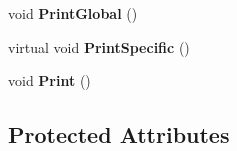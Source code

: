\begin{DoxyCompactItemize}
\item 
\hypertarget{classElement_afcde5aa81a52b90a8bcf903d9b773ebc}{void {\bfseries Print\+Global} ()}\label{classElement_afcde5aa81a52b90a8bcf903d9b773ebc}

\item 
\hypertarget{classElement_adef0eb8aa2179a099c38d96217c237c0}{virtual void {\bfseries Print\+Specific} ()}\label{classElement_adef0eb8aa2179a099c38d96217c237c0}

\item 
\hypertarget{classElement_a623ce34f0347c395e33e79ef43d9b93d}{void {\bfseries Print} ()}\label{classElement_a623ce34f0347c395e33e79ef43d9b93d}

\end{DoxyCompactItemize}
\subsection*{Protected Attributes}
